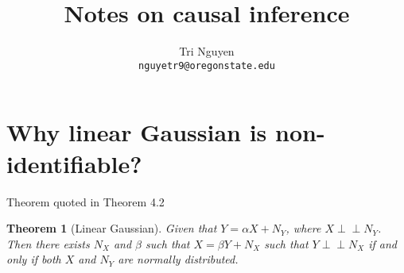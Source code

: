 \documentclass[11pt,a4paper]{article}
\title{Notes on causal inference}
\author{	Tri Nguyen \\
        \texttt{nguyetr9@oregonstate.edu} \\
        }
\newcommand{\indep}{\perp \!\!\! \perp}
\theoremstyle{plain}
\newtheorem{theorem}{Theorem}[section]
\theoremstyle{definition}
\theoremstyle{remark}
\begin{document}
\maketitle

\section{Why linear Gaussian is non-identifiable?}%

Theorem quoted in Theorem 4.2 \cite{peters2017elements}
\begin{theorem}[Linear Gaussian]
    \label{theorem:linear-gaussian}
    Given that $Y = \alpha X  + N_Y$, where $X \indep N_Y$. Then there exists $N_X$ and  $\beta$ such that
    $ X = \beta Y + N_X$ such that $Y \indep N_X$ if and only if both $X$ and  $N_Y$ are normally distributed.
\end{theorem}
\end{document}
